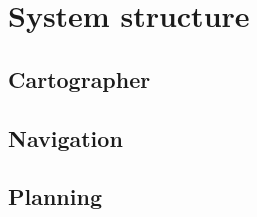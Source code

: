 
\section{System structure}
\label{sec:system}

\subsection{Cartographer}
\label{sec:cart}

\subsection{Navigation}
\label{sec:nav}

\subsection{Planning}
\label{sec:plan}





